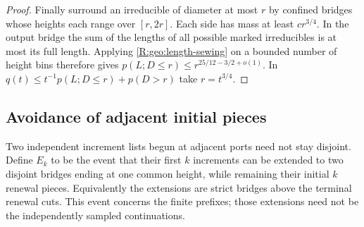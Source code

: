 \begin{proof}
Finally surround an irreducible of diameter at most $r$ by confined
bridges whose heights each range over $[r,2r]$.  Each side has mass at
least $c r^{3/4}$.  In the output bridge the sum of the lengths of all
possible marked irreducibles is at most its full length.  Applying
\eqref{R:geo:length-sewing} on a bounded number of height bins therefore
gives $p(L;D\le r)\le r^{25/12-3/2+o(1)}$.  In
$q(t)\le t^{-1}p(L;D\le r)+p(D>r)$ take $r=t^{3/4}$.
\end{proof}

\subsection{Avoidance of adjacent initial pieces}

Two independent increment lists begun at adjacent ports need not stay
disjoint.  Define $E_k$ to be the event that their first $k$ increments
can be extended to two disjoint bridges ending at one common height,
while remaining their initial $k$ renewal pieces.  Equivalently the
extensions are strict bridges above the terminal renewal cuts.
This event concerns the finite prefixes; those extensions need not be
the independently sampled continuations.

